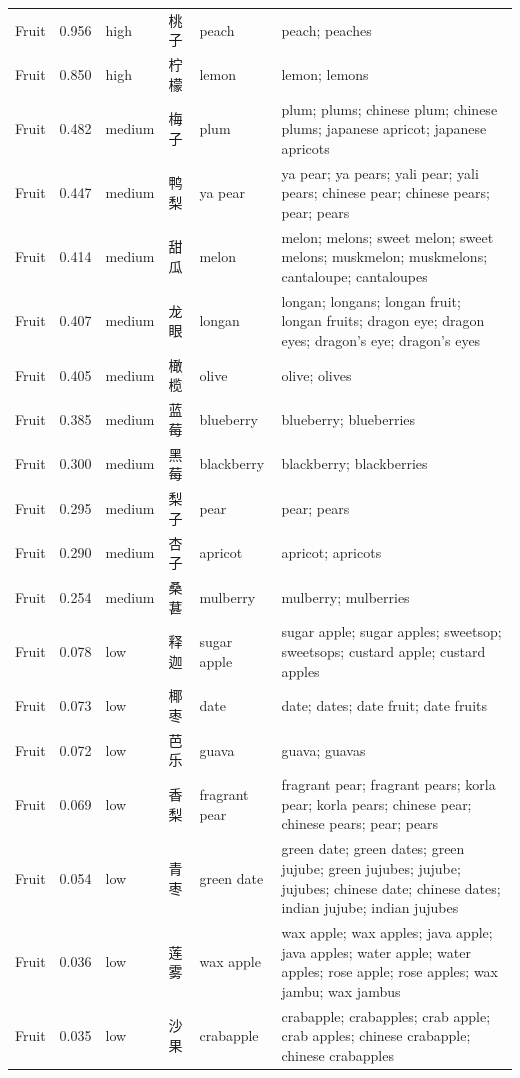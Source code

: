 {\begin{longtable}[c]{@{}>{\raggedright\arraybackslash}p{1.85cm}l l l>{\raggedright\arraybackslash}p{1.85cm}>{\raggedright\arraybackslash}p{8.10cm}@{}}
Fruit & 0.956 & high & 桃子 & peach & peach; peaches \\
Fruit & 0.850 & high & 柠檬 & lemon & lemon; lemons \\
Fruit & 0.482 & medium & 梅子 & plum & plum; plums; chinese plum; chinese plums; japanese apricot; japanese apricots \\
Fruit & 0.447 & medium & 鸭梨 & ya pear & ya pear; ya pears; yali pear; yali pears; chinese pear; chinese pears; pear; pears \\
Fruit & 0.414 & medium & 甜瓜 & melon & melon; melons; sweet melon; sweet melons; muskmelon; muskmelons; cantaloupe; cantaloupes \\
Fruit & 0.407 & medium & 龙眼 & longan & longan; longans; longan fruit; longan fruits; dragon eye; dragon eyes; dragon's eye; dragon's eyes \\
Fruit & 0.405 & medium & 橄榄 & olive & olive; olives \\
Fruit & 0.385 & medium & 蓝莓 & blueberry & blueberry; blueberries \\
Fruit & 0.300 & medium & 黑莓 & blackberry & blackberry; blackberries \\
Fruit & 0.295 & medium & 梨子 & pear & pear; pears \\
Fruit & 0.290 & medium & 杏子 & apricot & apricot; apricots \\
Fruit & 0.254 & medium & 桑葚 & mulberry & mulberry; mulberries \\
Fruit & 0.078 & low & 释迦 & sugar apple & sugar apple; sugar apples; sweetsop; sweetsops; custard apple; custard apples \\
Fruit & 0.073 & low & 椰枣 & date & date; dates; date fruit; date fruits \\
Fruit & 0.072 & low & 芭乐 & guava & guava; guavas \\
Fruit & 0.069 & low & 香梨 & fragrant pear & fragrant pear; fragrant pears; korla pear; korla pears; chinese pear; chinese pears; pear; pears \\
Fruit & 0.054 & low & 青枣 & green date & green date; green dates; green jujube; green jujubes; jujube; jujubes; chinese date; chinese dates; indian jujube; indian jujubes \\
Fruit & 0.036 & low & 莲雾 & wax apple & wax apple; wax apples; java apple; java apples; water apple; water apples; rose apple; rose apples; wax jambu; wax jambus \\
Fruit & 0.035 & low & 沙果 & crabapple & crabapple; crabapples; crab apple; crab apples; chinese crabapple; chinese crabapples \\

\end{longtable}}
